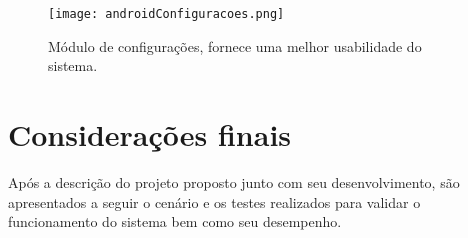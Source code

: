         \begin{figure}[!ht]
        \centering
        \texttt{[image: androidConfiguracoes.png]}
        \caption{Módulo de configurações, fornece uma melhor usabilidade do sistema.}
        \label{fig:config}
        \end{figure}
        
    
    \section{Considerações finais}
    
    Após a descrição do projeto proposto junto com seu desenvolvimento, são apresentados a seguir o cenário e os testes realizados para validar o funcionamento do sistema bem como seu desempenho.